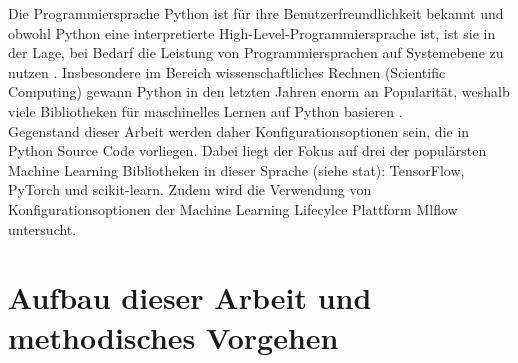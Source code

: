 \documentclass[german,bachelor]{swsLeipzig}
\begin{document}
Die Programmiersprache Python ist für ihre Benutzerfreundlichkeit bekannt und obwohl Python eine interpretierte High-Level-Programmiersprache ist,
ist sie in der Lage, bei Bedarf die Leistung von Programmiersprachen auf Systemebene zu nutzen \cite[S. 2]{2020}.
Insbesondere im Bereich wissenschaftliches Rechnen (Scientific Computing) gewann Python in den letzten Jahren enorm an Popularität,
weshalb viele Bibliotheken für maschinelles Lernen auf Python basieren \cite[S. 2]{2020}. \\

Gegenstand dieser Arbeit werden daher Konfigurationsoptionen sein, die in Python Source Code vorliegen.
Dabei liegt der Fokus auf drei der populärsten Machine Learning Bibliotheken in dieser Sprache (siehe stat): TensorFlow, PyTorch und scikit-learn.
Zudem wird die Verwendung von Konfigurationsoptionen der Machine Learning Lifecylce Plattform Mlflow untersucht.










\section{Aufbau dieser Arbeit und methodisches Vorgehen}
\end{document}

